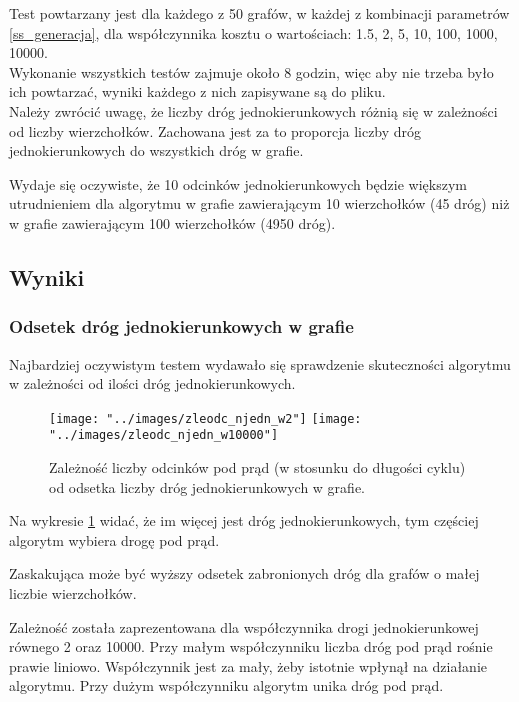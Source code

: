 \documentclass{article}
\begin{document}
Test powtarzany jest dla każdego z 50 grafów, w każdej z kombinacji parametrów \ref{ss_generacja}, dla współczynnika kosztu o wartościach: 1.5, 2, 5, 10, 100, 1000, 10000. \\

Wykonanie wszystkich testów zajmuje około 8 godzin, więc aby nie trzeba było ich powtarzać, wyniki każdego z nich zapisywane są do pliku. \\

Należy zwrócić uwagę, że liczby dróg jednokierunkowych różnią się w zależności od liczby wierzchołków. Zachowana jest za to proporcja liczby dróg jednokierunkowych do wszystkich dróg w grafie. 

Wydaje się oczywiste, że 10 odcinków jednokierunkowych będzie większym utrudnieniem dla algorytmu w grafie zawierającym 10 wierzchołków (45 dróg) niż w grafie zawierającym 100 wierzchołków (4950 dróg). 


\subsection{Wyniki}
\label{ss_wyniki}

\subsubsection{Odsetek dróg jednokierunkowych w grafie}
Najbardziej oczywistym testem wydawało się sprawdzenie skuteczności algorytmu w zależności od ilości dróg jednokierunkowych.

\begin{figure}
\texttt{[image: "../images/zleodc\_njedn\_w2"]}
\texttt{[image: "../images/zleodc\_njedn\_w10000"]}
\caption{Zależność liczby odcinków pod prąd (w stosunku do długości cyklu) od odsetka liczby dróg jednokierunkowych w grafie.}
\label{fig_drogi_jednokier}
\end{figure}
Na wykresie \ref{fig_drogi_jednokier} widać, że im więcej jest dróg jednokierunkowych, tym częściej algorytm wybiera drogę pod prąd. 

Zaskakująca może być wyższy odsetek zabronionych dróg dla grafów o małej liczbie wierzchołków. 

Zależność została zaprezentowana dla współczynnika drogi jednokierunkowej równego 2 oraz 10000. Przy małym współczynniku liczba dróg pod prąd rośnie prawie liniowo. Współczynnik jest za mały, żeby istotnie wpłynął na działanie algorytmu. Przy dużym współczynniku algorytm unika dróg pod prąd. \\
\end{document}
